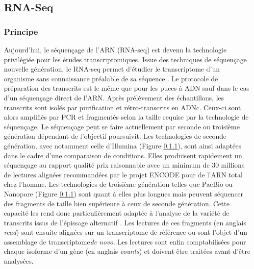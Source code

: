 


\subsection{RNA-Seq}

\subsubsection{Principe}

Aujourd'hui, le séquençage de l'ARN (RNA-seq) est devenu la technologie privilégiée pour les études transcriptomiques. Issue des techniques de séquençage nouvelle génération, le RNA-seq permet d'étudier le transcriptome d'un organisme sans connaissance préalable de sa séquence \cite{Wang2009Jan}. Le protocole de préparation des transcrits est le même que pour les puces à ADN sauf dans le cas d'un séquençage direct de l'ARN. Après prélèvement des échantillons, les transcrits sont isolés par purification et rétro-transcrits en ADNc. Ceux-ci sont alors amplifiés par PCR et fragmentés selon la taille requise par la technologie de séquençage. Le séquençage peut se faire actuellement par seconde ou troisième génération dépendant de l'objectif poursuivit. Les technologies de seconde génération, avec notamment celle d'Illumina (Figure \ref{}), sont ainsi adaptées dans le cadre d'une comparaison de conditions. Elles produisent rapidement un séquençage au rapport qualité prix raisonnable avec un minimum de 30 millions de lectures alignées recommandées par le projet ENCODE \cite{ENCODE2012} pour de l'ARN total chez l'homme. Les technologies de troisième génération telles que PacBio ou Nanopore (Figure \ref{}) sont quant à elles plus longues mais peuvent séquencer des fragments de taille bien supérieure à ceux de seconde génération. Cette capacité les rend donc particulièrement adaptée à l'analyse de la variété de transcrits issus de l'épissage alternatif \cite{Bergsma2018Jan}. Les lectures de ces fragments (en anglais \textit{read}) sont ensuite alignées sur un transcriptome de référence ou sont l'objet d'un assemblage de transcriptome\textit{de novo}. Les lectures sont enfin comptabilisées pour chaque isoforme d'un gène (en anglais \textit{counts}) et doivent être traitées avant d'être analysées.

